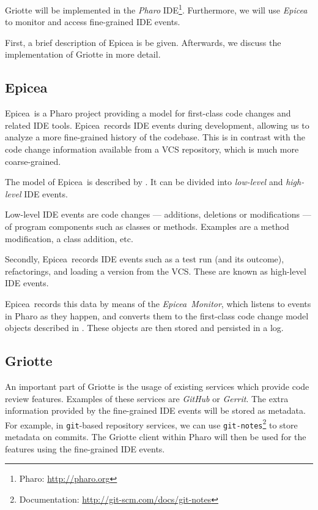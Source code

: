 \documentclass[conference,a4paper]{IEEEtran}
\newcommand{\Ep}{Epicea}
\newcommand{\code}[1]{\texttt{#1}}
\begin{document}
Griotte will be implemented in the \textit{Pharo}
IDE\cite{Blac09a}\footnote{Pharo: \url{http://pharo.org}}.
Furthermore, we will use \textit{Epicea}\cite{Dias13a} to monitor and
access fine-grained IDE events.

First, a brief description of Epicea is be given. Afterwards, we
discuss the implementation of Griotte in more detail.

\subsection{Epicea}
\label{sec:epicea}

\Ep\ is a Pharo project providing a model for first-class code changes
and related IDE tools. \Ep\ records IDE events during development,
allowing us to analyze a more fine-grained history of the
codebase. This is in contrast with the code change information
available from a VCS repository, which is much more coarse-grained.

The model of \Ep\ is described by . It
can be divided into \textit{low-level} and \textit{high-level} IDE
events.

Low-level IDE events are code changes --- additions, deletions or
modifications --- of program components such as classes or
methods. Examples are a method modification, a class addition, etc.

Secondly, \Ep\ records IDE events such as a test run (and its
outcome), refactorings, and loading a version from the VCS. These are
known as high-level IDE events.

\Ep\ records this data by means of the \textit{\Ep\ Monitor}, which
listens to events in Pharo as they happen, and converts them to the
first-class code change model objects described in
. These objects are then stored and
persisted in a log.

\subsection{Griotte}
\label{sec:griotte}

An important part of Griotte is the usage of existing services which
provide code review features. Examples of these services are
\textit{GitHub} or \textit{Gerrit}. The extra information provided by
the fine-grained IDE events will be stored as metadata. For example,
in \code{git}-based repository services, we can use
\code{git-notes}\footnote{Documentation:
  \url{http://git-scm.com/docs/git-notes}} to store metadata on
commits. The Griotte client within Pharo will then be used for the
features using the fine-grained IDE events.
\end{document}
